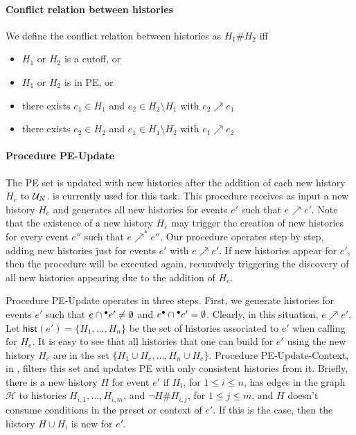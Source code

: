 \documentclass{article}
\newcommand{\hist}[1]{\ensuremath{\mathsf{hist}(#1)}}
\newcommand{\h}{\ensuremath{\mathcal{H}}}
\newcommand{\pe}{{\sc PE}}
\newcommand{\peupdate}{{\sc PE-Update}}
\newcommand{\peupdatecont}{{\sc PE-Update-Context}}
\begin{document}
\paragraph{Conflict relation between histories}  We define the conflict
relation between histories as $H_1 \# H_2 $ iff
\begin{itemize}
\item $H_1$ or $H_2$ is a cutoff, or 
\item $H_1$ or $H_2$ is in \pe{}, or
\item there exists $e_1 \in H_1$ and $e_2 \in H_2 \setminus H_1$ with $e_2
\nearrow e_1$
\item there exists $e_2 \in H_2$ and $e_1 \in H_1 \setminus H_2$ with $e_1
\nearrow e_2$
\end{itemize}

\paragraph{Procedure \peupdate{}}  The \pe{} set is updated with new histories
after the addition of each new history $H_e$ to $\mathcal{U}_{N}$.   is
currently used for this task.  This procedure receives as input a new history
$H_e$ and generates all new histories for events $e'$ such that $e \nearrow
e'$.  Note that the existence of a new history $H_e$ may trigger the creation
of new histories for every event $e''$ such that $e \nearrow^* e''$.  Our
procedure operates step by step, adding new histories just for events $e'$ with
$e \nearrow e'$.  If new histories appear for $e'$, then the procedure will be
executed again, recursively triggering the discovery of all new histories
appearing due to the addition of $H_e$.

Procedure \peupdate{} operates in three steps.  First, we generate histories
for events $e'$ such that $\underline{e} \cap {}^\bullet e' \neq \emptyset$ and $e^\bullet
\cap {}^\bullet e' = \emptyset$.  Clearly, in this situation, $e \nearrow e'$.  Let
$\hist{e'} = \{H_1, \ldots, H_n\}$ be the set of histories associated to $e'$
when calling  for $H_e$.  It is easy to see that all histories
that one can build for $e'$ using the new history $H_e$ are in the set $\{H_1
\cup H_e, \ldots, H_n \cup H_e\}$.  Procedure \peupdatecont{}, in
, filters this set and updates \pe{} with only consistent
histories from it.  Briefly, there is a new history $H$ for event $e'$ if
$H_i$, for $1 \le i \le n$, has edges in the graph $\h$ to histories $H_{i,1},
\ldots, H_{i,m}$, and $\lnot H \# H_{i,j}$, for $1 \le j \le m$, and $H$ doesn't
consume conditions in the preset or context of $e'$.  If this is the case, then
the history $H \cup H_i$ is new for $e'$.
\end{document}
